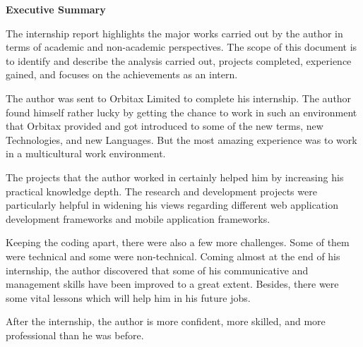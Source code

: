 \vspace{\fill}
\begin{center}
\begin{large}
\textbf{Executive Summary
}\\
\end{large}
\end{center}
\vspace{20pt}
\begin{flushleft}
The internship report highlights the major works carried out by the author in terms of academic and non-academic perspectives. The scope of this document is to identify and describe the analysis carried out, projects completed, experience gained, and focuses on the achievements as an intern.


The author was sent to Orbitax Limited to complete his internship. The author found himself rather lucky by getting the chance to work in such an environment that Orbitax provided and got introduced to some of the new terms, new Technologies, and new Languages. But the most amazing experience was to work in a multicultural work environment.\\\vspace{15pt}

The projects that the author worked in certainly helped him by increasing his practical knowledge depth. The research and development projects were particularly helpful in widening his views regarding different web application development frameworks and mobile application frameworks.\\\vspace{15pt}


Keeping the coding apart, there were also a few more challenges. Some of them were technical and some were non-technical. Coming almost at the end of his internship, the author discovered that some of his communicative and management skills have been improved to a great extent. Besides, there were some vital lessons which will help him in his future jobs.\\\vspace{25pt}


After the internship, the author is more confident, more skilled, and more professional than he was before.

\end{flushleft}
